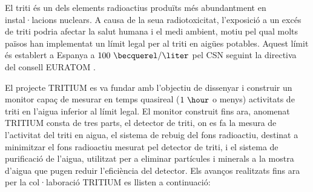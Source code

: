 El triti és un dels elements radioactius produïts més abundantment en instal·lacions nuclears. A causa de la seua radiotoxicitat, l'exposició a un excés de triti podria afectar la salut humana i el medi ambient, motiu pel qual molts països han implementat un límit legal per al triti en aigües potables. Aquest límit és establert a Espanya a $100~\becquerel/\liter$ pel CSN seguint la directiva del consell EURATOM \cite{100BqL}.

El projecte TRITIUM es va fundar amb l'objectiu de dissenyar i construir un monitor capaç de mesurar en temps quasireal ($1~\hour$ o menys) activitats de triti en l'aigua inferior al límit legal. El monitor construit fins ara, anomenat TRITIUM consta de tres parts, el detector de triti, on es fa la mesura de l'activitat del triti en aigua, el sistema de rebuig del fons radioactiu, destinat a minimitzar el fons radioactiu mesurat pel detector de triti, i el sistema de purificació de l'aigua, utilitzat per a eliminar partícules i minerals a la mostra d'aigua que pugen reduir l'eficiència del detector. Els avanços realitzats fins ara per la col·laboració TRITIUM es llisten a continuació:

